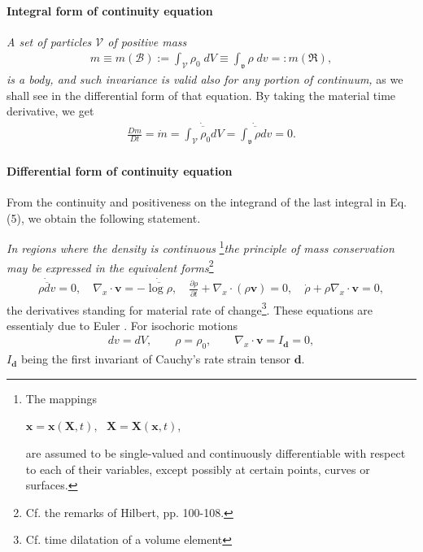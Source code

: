 \documentclass[12pt]{article}
\begin{document}
\paragraph{Integral form of continuity equation}
{\em A set of particles $\mathscr{V}$ of positive mass
\begin{align}
m\equiv m(\mathscr{B}):=\int_{\mathscr{V}}\rho_0\; dV \equiv 
\int_{\mathfrak{v}}\rho\; dv =: m(\Re),
\end{align}
is a body, and such invariance is valid also for any portion of continuum,} as we shall see in the differential form of that equation. By taking the material time derivative, we get
\begin{align}
\frac{Dm}{Dt}=\dot{m}=\dot{\overline{\int_{\mathscr{V}}\rho_0 dV}}=
\dot{\overline{\int_{\mathfrak{v}}\rho {dv}}}=0.
\end{align} 
\paragraph{Differential form of continuity equation}
From the continuity and positiveness on the integrand of the last integral in Eq.(5), we obtain the following statement.

{\em In regions where the density is continuous} {\footnote{The mappings 

$\mathbf{x}=\mathbf{x}(\mathbf{X},t),\,\,$ $\mathbf{X}=\mathbf{X}(\mathbf{x},t)$,

are assumed to be single-valued and continuously differentiable with respect to each of their variables, except possibly at certain points, curves or surfaces.}}{\em the principle of mass conservation  may be expressed in the equivalent forms}{\footnote{Cf. the remarks of Hilbert\cite{cite:Hilbert}, 
pp. 100-108.}} 
\begin{align}
\dot{\overline{\rho dv}}=0,\quad \nabla_{\!x}\!\cdot\!\mathbf{v}=
-\dot{\overline{\log{\rho}}},\quad 
\frac{\partial\rho}{\partial{t}}+\nabla_{\!x}\!\cdot\!(\rho\mathbf{v})=0,\quad
\dot{\rho}+\rho\nabla_{\!x}\!\cdot\!\mathbf{v}=0,
\end{align}
the derivatives standing for material rate of change{\footnote {Cf. time dilatation of a volume element}}. These equations are essentialy due to Euler 
\cite{cite:Euler2}. For isochoric motions
\begin{align*}
 dv=dV,\qquad \rho=\rho_0,\qquad \nabla_{\!x}\!\cdot\!\mathbf{v}=I_{\mathbf{d}}=0,
\end{align*}
$I_{\mathbf{d}}$ being the first invariant of Cauchy's rate strain tensor $\mathbf{d}$.
\end{document}
